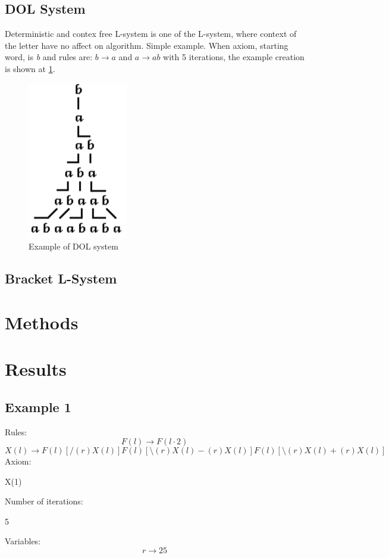 \documentclass[b5paper,twoside,11pt]{article}
\begin{document}
\subsection*{DOL System}
Deterministic and contex free L-system is one of the L-system, where context of the letter have no affect on algorithm. Simple example. When axiom, starting word, is \textit{b} and rules are: $b \rightarrow a$ and $a \rightarrow ab$ with 5 iterations, the example creation is shown at \figurename\ref{DOL}.

\begin{figure}[!htp]
\centering
  \includegraphics[width=0.2\linewidth]{DOL-system}
\caption{Example of DOL system\cite{prusinABOP} \label{DOL}}
\end{figure}
\subsection*{Bracket L-System}
\section{Methods}

\section{Results}
\subsection*{Example 1}
Rules: \newline
\begin{equation*}
F(l)\rightarrow F(l\cdot2) 
\end{equation*}
\begin{equation*}
X(l) \rightarrow F(l)[/(r)X(l)]F(l)[\setminus(r)X(l)-(r)X(l)]F(l)[\setminus(r)X(l)+(r)X(l)] 
\end{equation*}
Axiom:
\begin{center}
X(1)
\end{center}
Number of iterations:
\begin{center}
5
\end{center}
Variables:
\begin{equation*}
r\rightarrow 25
\end{equation*}
\end{document}
